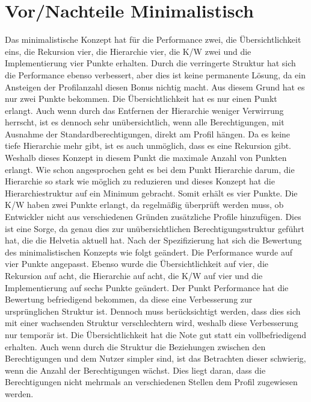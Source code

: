 \section{Vor/Nachteile Minimalistisch}
\label{sec:chapter05:Minimalistisch}
Das minimalistische Konzept hat für die Performance zwei, die Übersichtlichkeit eins, die Rekursion vier, die Hierarchie vier, die \ac{K/W} zwei und die Implementierung vier Punkte erhalten.
Durch die verringerte Struktur hat sich die Performance ebenso verbessert, aber dies ist keine permanente Lösung, da ein Ansteigen der Profilanzahl diesen Bonus nichtig macht.
Aus diesem Grund hat es nur zwei Punkte bekommen.
Die Übersichtlichkeit hat es nur einen Punkt erlangt.
Auch wenn durch das Entfernen der Hierarchie weniger Verwirrung herrscht, ist es dennoch sehr unübersichtlich, wenn alle Berechtigungen, mit Ausnahme der Standardberechtigungen, direkt am Profil hängen.
Da es keine tiefe Hierarchie mehr gibt, ist es auch unmöglich, dass es eine Rekursion gibt.
Weshalb dieses Konzept in diesem Punkt die maximale Anzahl von Punkten erlangt.
Wie schon angesprochen geht es bei dem Punkt Hierarchie darum, die Hierarchie so stark wie möglich zu reduzieren und dieses Konzept hat die Hierarchiestruktur auf ein Minimum gebracht. Somit erhält es vier Punkte.
Die \ac{K/W} haben zwei Punkte erlangt, da regelmäßig überprüft werden muss, ob Entwickler nicht aus verschiedenen Gründen zusätzliche Profile hinzufügen.
Dies ist eine Sorge, da genau dies zur unübersichtlichen Berechtigungsstruktur geführt hat, die die Helvetia aktuell hat.
\newline
\newline
Nach der Spezifizierung hat sich die Bewertung des minimalistischen Konzepts wie folgt geändert.
Die Performance wurde auf vier Punkte angepasst. Ebenso wurde die Übersichtlichkeit auf vier, die Rekursion auf acht, die Hierarchie auf acht, die \ac{K/W} auf vier und die Implementierung auf sechs Punkte geändert.
Der Punkt Performance hat die Bewertung befriedigend bekommen, da diese eine Verbesserung zur ursprünglichen Struktur ist.
Dennoch muss berücksichtigt werden, dass dies sich mit einer wachsenden Struktur verschlechtern wird, weshalb diese Verbesserung nur temporär ist.
Die Übersichtlichkeit hat die Note gut statt ein vollbefriedigend erhalten.
Auch wenn durch die Struktur die Beziehungen zwischen den Berechtigungen und dem Nutzer simpler sind, ist das Betrachten dieser schwierig, wenn die Anzahl der Berechtigungen wächst.
Dies liegt daran, dass die Berechtigungen nicht mehrmals an verschiedenen Stellen dem Profil zugewiesen werden.
